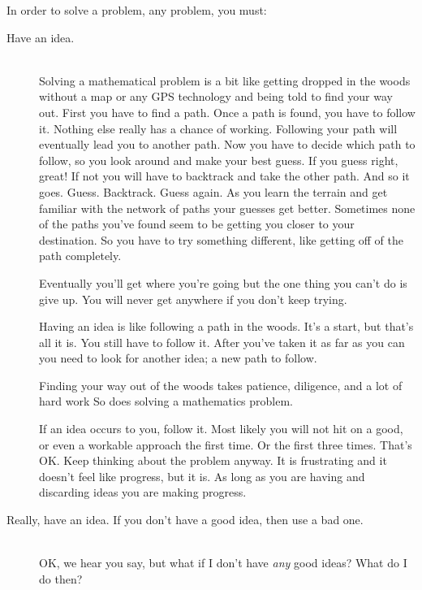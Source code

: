 In order to solve a problem, any problem, you must:
\begin{description}
\item[Have an idea.]\ \\  Solving a mathematical problem is a bit like
  getting dropped in the woods without a map or any GPS technology and
  being told to find your way out. First you have to find a path. Once a path is found, you
  have to follow it. Nothing else really has a chance of working.
  Following your path will eventually lead you to another path. Now
  you have to decide which path to follow, so you look around and make
  your best guess. If you guess right, great! If not you will have to
  backtrack and take the other path. And so it
  goes. Guess. Backtrack. Guess again. As you learn the terrain and
  get familiar with the network of paths your guesses get
  better.  Sometimes none
  of the paths you've found seem to be getting you closer to your
  destination. So you have to try something different, like getting
  off of the path completely.  

  Eventually you'll get where you're going but the one thing you can't
  do is give up. You will never get anywhere if you don't keep trying.

  Having an idea is like following a path in the woods. It's a start,
  but that's all it is. You still have to follow it. After you've
  taken it as far as you can you need to look for another idea; a new
  path to follow.

  Finding your way out of the woods takes patience, diligence, and a
  lot of hard work So does solving a mathematics problem.

  If an idea occurs to you, follow it. Most likely you will not hit on
  a good, or even a workable approach the first time. Or the first
  three times. That's OK. Keep thinking about the problem anyway. It
  is frustrating and it doesn't feel like progress, but it is. As long
  as you are having and discarding ideas you are making progress.
\item[Really, have an idea. If you don't have a good idea, then
  use a bad one.] \ \\
  OK, we hear you say, but what if I don't have \emph{any} good
  ideas? What do I do then?


\end{description}
